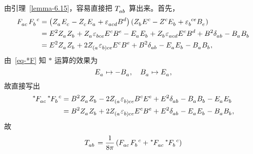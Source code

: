 \begin{xiti}
\begin{zm}
			\begin{tcolorbox}[breakable,title=补充,fonttitle=\normalfont\bfseries]
				由引理~\ref{lemma-6.15}，容易直接把 $\tensor{T}{_a_b}$ 算出来。首先，
				\begin{equation*}
					\begin{split}
						\tensor{F}{_a_c} \tensor{F}{_b^c} &= \left( \tensor{Z}{_a} \tensor{E}{_c} - \tensor{Z}{_c} \tensor{E}{_a} + \tensor{\varepsilon}{_a_c_d} \tensor{B}{^d} \right) \left( \tensor{Z}{_b} \tensor{E}{^c} - \tensor{Z}{^c} \tensor{E}{_b} + \tensor{\varepsilon}{_b^c^e} \tensor{B}{_e} \right)\\
						&= E^2 \tensor{Z}{_a} \tensor{Z}{_b} + \tensor{Z}{_a} \tensor{\varepsilon}{_b_c_e} \tensor{E}{^c} \tensor{B}{^e} - \tensor{E}{_a} \tensor{E}{_b} + \tensor{Z}{_b} \tensor{\varepsilon}{_a_c_d} \tensor{E}{^c} \tensor{B}{^d} + B^2 \tensor{\delta}{_a_b} - \tensor{B}{_a} \tensor{B}{_b}\\
						&= E^2 \tensor{Z}{_a} \tensor{Z}{_b} + 2\tensor{Z}{_{(a}} \tensor{\varepsilon}{_{b)}_c_e} \tensor{E}{^c} \tensor{B}{^e} + B^2 \tensor{\delta}{_a_b} - \tensor{E}{_a} \tensor{E}{_b} - \tensor{B}{_a} \tensor{B}{_b},
					\end{split}
				\end{equation*}
				由~\eqref{eq-*F} 知 $*$ 运算的效果为
				\begin{equation*}
					\tensor{E}{_a} \mapsto - \tensor{B}{_a} \qc \tensor{B}{_a} \mapsto \tensor{E}{_a},
				\end{equation*}
				故直接写出
				\begin{equation*}
					\begin{split}
						\tensor[^*]{F}{_a_c} \tensor[^*]{F}{_b^c} &= B^2 \tensor{Z}{_a} \tensor{Z}{_b} - 2\tensor{Z}{_{(a}} \tensor{\varepsilon}{_{b)}_c_e} \tensor{B}{^c} \tensor{E}{^e} + E^2 \tensor{\delta}{_a_b} - \tensor{B}{_a} \tensor{B}{_b} - \tensor{E}{_a} \tensor{E}{_b}\\
						&= B^2 \tensor{Z}{_a} \tensor{Z}{_b} + 2\tensor{Z}{_{(a}} \tensor{\varepsilon}{_{b)}_c_e} \tensor{E}{^c} \tensor{B}{^e} + E^2 \tensor{\delta}{_a_b} - \tensor{E}{_a} \tensor{E}{_b} - \tensor{B}{_a} \tensor{B}{_b},
					\end{split}
				\end{equation*}
				故
				\begin{equation*}
					\begin{split}
						\tensor{T}{_a_b} &= \frac{1}{8\pi} \left( \tensor{F}{_a_c} \tensor{F}{_b^c} + \tensor[^*]{F}{_a_c} \tensor[^*]{F}{_b^c} \right)\\

\end{split}
\end{equation*}
\end{tcolorbox}
\end{zm}
\end{xiti}

